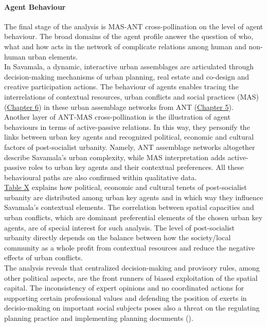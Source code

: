 \documentclass[11pt]{report}
\begin{document}
\paragraph{Agent Behaviour}

The final stage of the analysis is MAS-ANT cross-pollination on the level of agent behaviour.
The broad  domains  of  the  agent  profile  answer  the  question  of  who,  what  and  how  acts  in  the  network  of complicate relations among human and non-human urban elements.
\\

In Savamala, a dynamic, interactive urban assemblages are articulated through decision-making mechanisms of urban planning, real estate and co-design and creative participation actions.
The behaviour of agents enables tracing the interrelations of contextual resources, urban conflicts and social practices (MAS) (\href{Chapter 6}{Chapter 6}) in these urban assemblage networks from ANT (\href{Chapter 5}{Chapter 5}).
\\

Another layer of ANT-MAS cross-pollination is the illustration of agent behaviours in terms of active-passive relations.
In this way, they personify the links between urban key agents and recognized political, economic and cultural factors of post-socialist urbanity. 
Namely, ANT assemblage networks altogether describe Savamala's urban complexity, while MAS interpretation adds active-passive roles to urban key agents and their contextual preferences. 
All these behavioural paths are also confirmed within qualitative data.
\\

\href{TableX}{Table X} explains how political, economic and cultural tenets of post-socialist urbanity are distributed among urban key agents and in which way they influence Savamala's contextual elements.
The correlation between spatial capacities and urban conflicts, which are dominant preferential elements of the chosen urban key agents, are of special interest for such analysis.
The level of post-socialist urbanity directly depends on the balance between how the society/local community as a whole profit from contextual resources and reduce the negative effects of urban conflicts.
\\

The analysis reveals that centralized decision-making and provisory rules, among other political aspects, are the front runners of biased exploitation of the spatial capital.
The inconsistency of expert opinions and no coordinated actions for supporting certain professional values and defending the position of exerts in decisio-making on important social subjects poses also a threat on the regulating planning practice and implementing planning documents (\href{Vukmirovic}{\cite{VukmirovicEtAl2013}}).
\\
\end{document}
